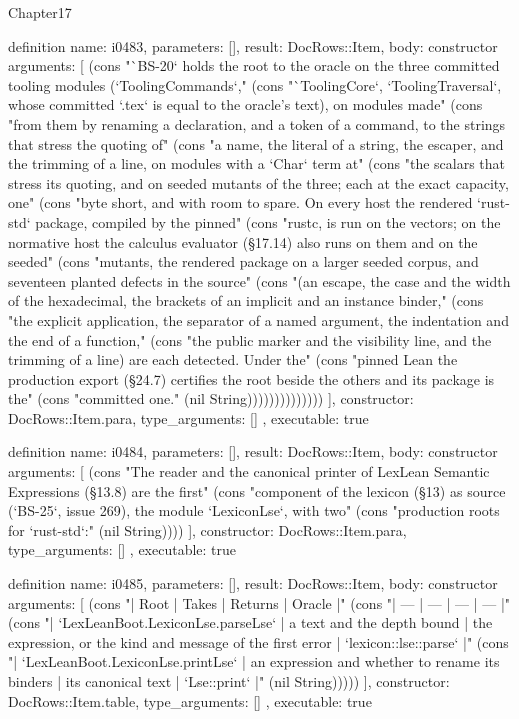 \begin{lexlean}{Chapter17}
\begin{semanticmodule}
definition{
  name: i0483,
  parameters: [],
  result: DocRows::Item,
  body: constructor{
    arguments: [
      (cons "`BS-20` holds the root to the oracle on the three committed tooling modules (`ToolingCommands`," (cons "`ToolingCore`, `ToolingTraversal`, whose committed `.tex` is equal to the oracle's text), on modules made" (cons "from them by renaming a declaration, and a token of a command, to the strings that stress the quoting of" (cons "a name, the literal of a string, the escaper, and the trimming of a line, on modules with a `Char` term at" (cons "the scalars that stress its quoting, and on seeded mutants of the three; each at the exact capacity, one" (cons "byte short, and with room to spare. On every host the rendered `rust-std` package, compiled by the pinned" (cons "rustc, is run on the vectors; on the normative host the calculus evaluator (§17.14) also runs on them and on the seeded" (cons "mutants, the rendered package on a larger seeded corpus, and seventeen planted defects in the source" (cons "(an escape, the case and the width of the hexadecimal, the brackets of an implicit and an instance binder," (cons "the explicit application, the separator of a named argument, the indentation and the end of a function," (cons "the public marker and the visibility line, and the trimming of a line) are each detected. Under the" (cons "pinned Lean the production export (§24.7) certifies the root beside the others and its package is the" (cons "committed one." (nil String))))))))))))))
    ],
    constructor: DocRows::Item.para,
    type_arguments: []
  },
  executable: true
}

definition{
  name: i0484,
  parameters: [],
  result: DocRows::Item,
  body: constructor{
    arguments: [
      (cons "The reader and the canonical printer of LexLean Semantic Expressions (§13.8) are the first" (cons "component of the lexicon (§13) as source (`BS-25`, issue 269), the module `LexiconLse`, with two" (cons "production roots for `rust-std`:" (nil String))))
    ],
    constructor: DocRows::Item.para,
    type_arguments: []
  },
  executable: true
}

definition{
  name: i0485,
  parameters: [],
  result: DocRows::Item,
  body: constructor{
    arguments: [
      (cons "| Root | Takes | Returns | Oracle |" (cons "| --- | --- | --- | --- |" (cons "| `LexLeanBoot.LexiconLse.parseLse` | a text and the depth bound | the expression, or the kind and message of the first error | `lexicon::lse::parse` |" (cons "| `LexLeanBoot.LexiconLse.printLse` | an expression and whether to rename its binders | its canonical text | `Lse::print` |" (nil String)))))
    ],
    constructor: DocRows::Item.table,
    type_arguments: []
  },
  executable: true
}


\end{semanticmodule}
\end{lexlean}

